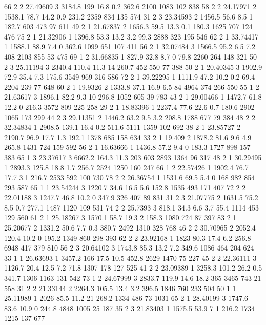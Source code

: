 66	2	2	27.49609	3	3184.8	199		16.8	0.2		362.6	2100	1083	102		838
58	2	2	24.17971	2	1538.1	78.7	14.2	0.9		231.2	2359	834		135		574
31	2	3	23.34593	2	1456.5	56.6	8.5		1		182.7	603		473		97		611
49	2	1	21.67837	2	1656.3	59.5	13.3	0.1		180.3	1625	707		124		476
75	2	1	21.32906	1	1396.8	53.3	13.2	3.2		99.3	2888	323		195		546
62	2	1	33.74417	1	1588.1	88.9	7.4		0		362.6	1099	651		107		411
56	2	1	32.07484	3	1566.5	95.2	6.5		7.2		408		2103	855		53		475
69	1	2	31.66835	1	827.9	32.8	8.7		0		79.8	2260	264		148		321
50	2	3	25.11194	3	2340.4	110.4	11.3	14		260.7	452		550		77		388
50	2	1	20.40345	3	1902.9	72.9	35.4	7.3		175.6	3549	969		316		586
72	2	1	39.22295	1	1111.9	47.2	10.2	0.2		69.4	2204	239		77		648
60	2	1	19.9326	    2	1333.8	37.1	16.9	6.5		84		4964	374		266		550
55	1	2	21.63617	3	1896.1	82.2	9.3		10		296.8	1052	605		39		783
43	2	1	29.00466	1	1472.7	61.8	12.2	0		216.3	3572	809		225		258
29	2	1	18.83396	1	2237.4	77.6	22.6	0.7		180.6	2902	1065	173		299
44	2	3	29.11351	2	1446.2	63.2	9.5		3.2		208.8	1788	677		79		384
48	2	2	32.34834	1	2908.5	139.1	16.4	0.2		511.6	5111	1359	102		692
38	2	1	23.85727	2	2190.7	96.9	17.7	1.3		192.1	1378	685		158		634
33	2	1	19.409	    2	1878.2	81.6	9.6		4.9		265.8	1431	724		159		592
56	2	1	16.63666	1	1436.8	57.2	9.4		0		183.3	1727	898		157		383
65	1	3	23.37617	3	6662.2	164.3	11.3	203		603		2893	1364	96		317
48	2	1	30.29495	1	2893.3	125.8	18.8	1.7		256.7	2524	1250	160		247
66	1	2	22.57426	1	1902.4	76.7	17.7	3.1		216.7	2533	592		100		730
78	2	2	26.36754	1	1531.6	69.5	5.4		0		168		982		854		293		587
65	1	1	23.54244	3	1220.7	34.6	16.5	5.6		152.8	1535	493		171		407
72	2	2	22.01188	3	1247.7	46.8	10.2	0		347.9	326		407		89		831
31	2	3	21.07775	2	1631.5	75.2	8.5		0.7		277.1	1487	1120	109		531
74	2	2	25.7393	    3	818.1	34.3	6.6		3.7		55.4	1114	453		129		560
61	2	1	25.18267	3	1570.1	58.7	19.3	2		158.3	1080	724		87		397
83	2	1	25.20677	2	1331.2	50.6	7.7		0.3		380.7	2492	1310	328		768
46	2	2	30.70965	2	2052.4	120.4	10.2	0		195.2	1349	860		298		393
62	2	2	23.92168	1	1823	80.3	17.4	6.2		256.8	6948	417		379		810
56	2	3	20.64102	3	1743.8	85.3	13.2	7.2		349.6	1086	464		204		624
33	1	1	26.63693	1	3457.2	166		17.5	10.5	452.8	2629	1470	75		227
45	2	2	22.36111	3	1126.7	20.4	12.5	7.2		71.8	1307	178		127		525
41	2	2	23.09389	1	3258.3	101.2	26.2	0.5		341.7	1306	1163	131		542
73	1	2	24.67999	3	2833.7	119.9	14.6	18.2	365		3465	743		21		558
31	2	2	21.33144	2	2264.3	105.5	13.4	3.2		396.5	1846	760		233		504
50	1	1	25.11989	1	2026	85.5	11.2	21		268.2	1334	486		73		1031
65	2	1	28.40199	3	1747.6	83.6	10.9	0		244.8	4848	1005	25		187
35	2	3	21.83403	1	1575.5	53.9	7		1		216.2	1734	1215	137		677
